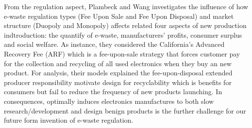 From the regulation aspect, Plambeck and Wang  \cite{plambeck2009effects}  investigates the influence of how e-waste regulation types (Fee Upon Sale and Fee Upon Disposal) and market structure (Duopoly and Monopoly) affects related four aspects of new production indtroduction: the quantify of e-waste, manufacturers' profits, consumer surplus and social welfare. 
As instance, they considered the California's Advanced Recovery Fee (ARF) which is a fee-upon-sale strategy that forces customer pay for the collection and recycling of all used electronics when they buy an new product. For analysis, their models explained the fee-upon-disposal extended producer responsibility motivate design for recyclability which is benefits for consumers but fail to reduce the frequency of new products launching.
In consequences, optimally induces electronics manufactures to both slow research/development and design benign products is the further challenge for our future form invention of e-waste regulation.